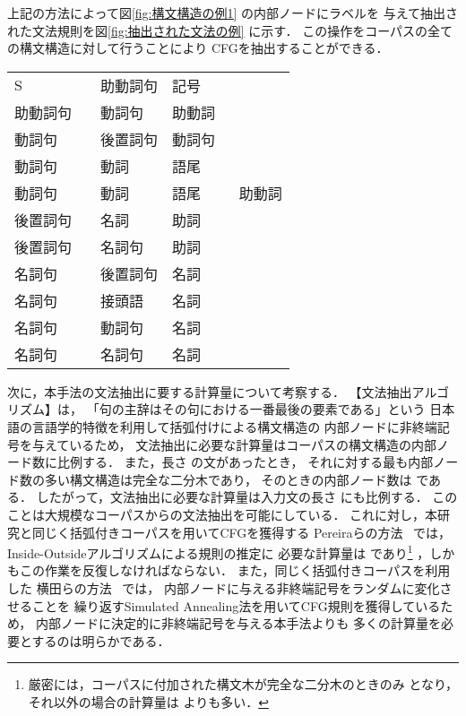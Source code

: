 \bigskip
上記の方法によって図\ref{fig:構文構造の例1} の内部ノードにラベルを
与えて抽出された文法規則を図\ref{fig:抽出された文法の例} に示す．
この操作をコーパスの全ての構文構造に対して行うことにより
CFGを抽出することができる．

\begin{center}
  \small
  \smallskip
  \begin{tabular}{lcll}
    S        &  & 助動詞句 & 記号 \\
    助動詞句 &  & 動詞句 & 助動詞 \\
    動詞句   &  & 後置詞句 & 動詞句 \\
    動詞句   &  & 動詞 & 語尾 \\
    動詞句   &  & 動詞 & 語尾 ~~~~ 助動詞 \\
    後置詞句 &  & 名詞 & 助詞 \\
    後置詞句 &  & 名詞句 & 助詞 \\
    名詞句   &  & 後置詞句 & 名詞 \\
    名詞句   &  & 接頭語 & 名詞 \\
    名詞句   &  & 動詞句 & 名詞 \\
    名詞句   &  & 名詞句 & 名詞 \\
  \end{tabular}

  \bigskip
\end{center}

次に，本手法の文法抽出に要する計算量について考察する．
【文法抽出アルゴリズム】は，
「句の主辞はその句における一番最後の要素である」という
日本語の言語学的特徴を利用して括弧付けによる構文構造の
内部ノードに非終端記号を与えているため，
文法抽出に必要な計算量はコーパスの構文構造の内部ノード数に比例する．
また，長さ  の文があったとき，
それに対する最も内部ノード数の多い構文構造は完全な二分木であり，
そのときの内部ノード数は  である．
したがって，文法抽出に必要な計算量は入力文の長さ  にも比例する．
このことは大規模なコーパスからの文法抽出を可能にしている．
これに対し，本研究と同じく括弧付きコーパスを用いてCFGを獲得する
Pereiraらの方法~\cite{pereira92a,schabes93b} では，
Inside-Outsideアルゴリズムによる規則の推定に
必要な計算量は であり\footnote{
  厳密には，コーパスに付加された構文木が完全な二分木のときのみ
   となり，それ以外の場合の計算量は よりも多い．}
，しかもこの作業を反復しなければならない．
また，同じく括弧付きコーパスを利用した
横田らの方法~\cite{yokota96a} では，
内部ノードに与える非終端記号をランダムに変化させることを
繰り返すSimulated Annealing法を用いてCFG規則を獲得しているため，
内部ノードに決定的に非終端記号を与える本手法よりも
多くの計算量を必要とするのは明らかである．
